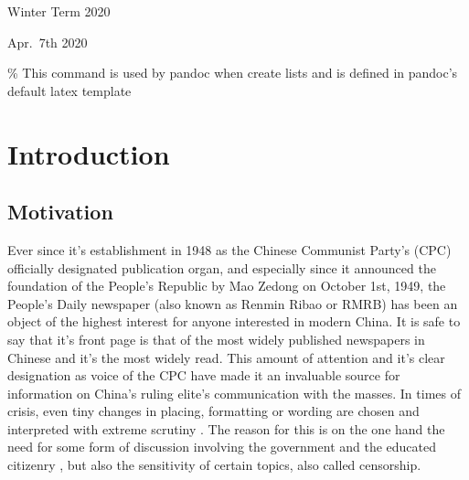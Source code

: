 \documentclass[12pt,a4paper]{article}
\begin{document}
\begin{titlepage}
  \noindent\begin{minipage}[t]{0.5\textwidth}
  \end{minipage}
  \begin{minipage}[t]{0.7\textwidth}
  \hspace{1cm}Winter Term 2020
  \end{minipage}

  \noindent\begin{minipage}[t]{0.5\textwidth}
  \end{minipage}
  \begin{minipage}[t]{0.7\textwidth}
  \hspace{1cm}Apr.~7th 2020
  \end{minipage}

\end{titlepage}

\restoregeometry


{
\hypersetup{linkcolor=black}
\setcounter{tocdepth}{3}
\tableofcontents
}
\newpage
\listoftables
\newpage
\listoffigures
\newpage
{} 
\% This command is used by pandoc when create lists and is defined in
pandoc's default latex template \providecommand{\tightlist}{%
  \setlength{\itemsep}{0pt}\setlength{\parskip}{0pt}}

\hypertarget{introduction}{%
\section{Introduction}\label{introduction}}

\hypertarget{motivation}{%
\subsection{Motivation}\label{motivation}}

Ever since it's establishment in 1948 as the Chinese Communist Party's
(CPC) officially designated publication organ, and especially since it
announced the foundation of the People's Republic by Mao Zedong on
October 1st, 1949, the People's Daily newspaper (also known as Renmin
Ribao or RMRB) has been an object of the highest interest for anyone
interested in modern China. It is safe to say that it's front page is
that of the most widely published newspapers in Chinese and it's the
most widely read. This amount of attention and it's clear designation as
voice of the CPC have made it an invaluable source for information on
China's ruling elite's communication with the masses. In times of
crisis, even tiny changes in placing, formatting or wording are chosen
and interpreted with extreme scrutiny \textcite{tan1990}. The reason for
this is on the one hand the need for some form of discussion involving
the government and the educated citizenry \textcite{kuhn2002}, but also
the sensitivity of certain topics, also called censorship.
\end{document}
